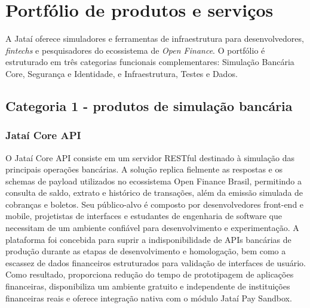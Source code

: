 \documentclass[
  12pt,
  openright,
  oneside,
  a4paper,
  brazilian
]{abntex2}
\begin{document}
\chapter{Portfólio de produtos e serviços}
\label{cap:portfolio_produtos}

A Jataí oferece simuladores e ferramentas de infraestrutura para desenvolvedores, \textit{fintechs} e pesquisadores do ecossistema de \textit{Open Finance}. O portfólio é estruturado em três categorias funcionais complementares: Simulação Bancária Core, Segurança e Identidade, e Infraestrutura, Testes e Dados.

\section{Categoria 1 - produtos de simulação bancária}
\label{sec:cat_simulacao_bancaria}

\subsection{Jataí Core API}
\label{subsec:jatai_core_api}

O Jataí Core API consiste em um servidor RESTful destinado à simulação das principais operações bancárias. A solução replica fielmente as respostas e os schemas de payload utilizados no ecossistema Open Finance Brasil, permitindo a consulta de saldo, extrato e histórico de transações, além da emissão simulada de cobranças e boletos. Seu público-alvo é composto por desenvolvedores front-end e mobile, projetistas de interfaces e estudantes de engenharia de software que necessitam de um ambiente confiável para desenvolvimento e experimentação. A plataforma foi concebida para suprir a indisponibilidade de APIs bancárias de produção durante as etapas de desenvolvimento e homologação, bem como a escassez de dados financeiros estruturados para validação de interfaces de usuário. Como resultado, proporciona redução do tempo de prototipagem de aplicações financeiras, disponibiliza um ambiente gratuito e independente de instituições financeiras reais e oferece integração nativa com o módulo Jataí Pay Sandbox.
\end{document}
